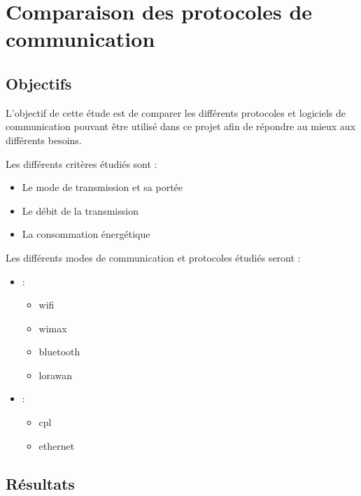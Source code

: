 \section{Comparaison des protocoles de communication}
\label{sec:comparaisonProtocoleCommnunication}

\subsection{Objectifs}
\label{sec:comparaisonProtocoleCommnunicationObjectifs}

L'objectif de cette étude est de comparer les différents protocoles et logiciels de communication
pouvant être utilisé dans ce projet afin de répondre au mieux aux différents besoins.\newline

Les différents critères étudiés sont :

\begin{itemize}
    \item Le mode de transmission et sa portée
    \item Le débit de la transmission
    \item La consommation énergétique
\end{itemize}

Les différents modes de communication et protocoles étudiés seront :

\begin{itemize}
    \item {} :
          \begin{itemize}
              \item \Gls{wifi}
              \item \Gls{wimax}
              \item \Gls{bluetooth}
              \item \Gls{lorawan}
          \end{itemize}
    \item {} :
          \begin{itemize}
              \item \Gls{cpl}
              \item \Gls{ethernet}
          \end{itemize}
\end{itemize}

\subsection{Résultats}
\label{sec:comparaisonProtocoleCommnunicationResultats}

